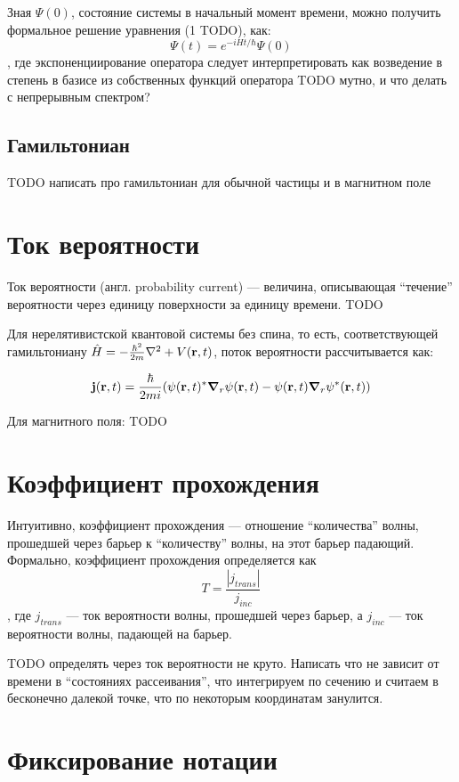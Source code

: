 Зная $\Psi(0)$, состояние системы в начальный момент времени, можно получить формальное решение уравнения (1 TODO), как:
\[
\Psi(t) = e^{-i H t / \hbar} \Psi(0)
\]
, где экспоненциирование оператора следует интерпретировать как возведение в степень в базисе из собственных функций оператора TODO мутно, и что делать с непрерывным спектром?

\subsection{Гамильтониан}
TODO написать про гамильтониан для обычной частицы и в магнитном поле

\section{Ток вероятности}
Ток вероятности (англ. probability current) — величина, описывающая ``течение'' вероятности через единицу поверхности за единицу времени. TODO 


Для нерелятивистской квантовой системы без спина, то есть, соответствующей гамильтониану $\hat{H} = - \frac{\hbar^2}{2m} \laplacian + V(\vb{r}, t)$, поток вероятности рассчитывается как:

\[
\vb{j}(\vb{r}, t) = \frac{\hbar}{2 m i} (\psi(\vb{r}, t)^* \grad_r{\psi(\vb{r}, t)} - \psi(\vb{r}, t) \grad_r{\psi^*(\vb{r}, t))}
\]

Для магнитного поля: TODO

\section{Коэффициент прохождения}
Интуитивно, коэффициент прохождения — отношение ``количества'' волны, прошедшей через барьер к ``количеству'' волны, на этот барьер падающий. Формально, коэффициент прохождения определяется как
\[
T = \frac{|j_{trans}|}{j_{inc}}
\]
, где $j_{trans}$ — ток вероятности волны, прошедшей через барьер, а $j_{inc}$ — ток вероятности волны, падающей на барьер.

TODO определять через ток вероятности не круто. Написать что не зависит от времени в ``состояниях рассеивания'', что интегрируем по сечению и считаем в бесконечно далекой точке, что по некоторым координатам занулится.

\section{Фиксирование нотации}
